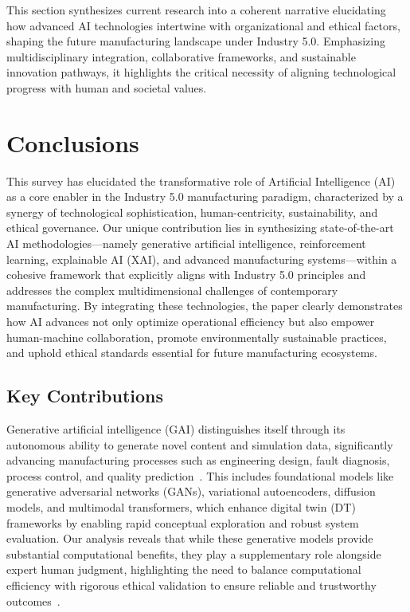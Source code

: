 \documentclass[sigconf]{acmart}
\begin{document}
This section synthesizes current research into a coherent narrative elucidating how advanced AI technologies intertwine with organizational and ethical factors, shaping the future manufacturing landscape under Industry 5.0. Emphasizing multidisciplinary integration, collaborative frameworks, and sustainable innovation pathways, it highlights the critical necessity of aligning technological progress with human and societal values.

\section{Conclusions}

This survey has elucidated the transformative role of Artificial Intelligence (AI) as a core enabler in the Industry 5.0 manufacturing paradigm, characterized by a synergy of technological sophistication, human-centricity, sustainability, and ethical governance. Our unique contribution lies in synthesizing state-of-the-art AI methodologies—namely generative artificial intelligence, reinforcement learning, explainable AI (XAI), and advanced manufacturing systems—within a cohesive framework that explicitly aligns with Industry 5.0 principles and addresses the complex multidimensional challenges of contemporary manufacturing. By integrating these technologies, the paper clearly demonstrates how AI advances not only optimize operational efficiency but also empower human-machine collaboration, promote environmentally sustainable practices, and uphold ethical standards essential for future manufacturing ecosystems.

\subsection{Key Contributions}

Generative artificial intelligence (GAI) distinguishes itself through its autonomous ability to generate novel content and simulation data, significantly advancing manufacturing processes such as engineering design, fault diagnosis, process control, and quality prediction~\cite{ref1,ref5,ref24}. This includes foundational models like generative adversarial networks (GANs), variational autoencoders, diffusion models, and multimodal transformers, which enhance digital twin (DT) frameworks by enabling rapid conceptual exploration and robust system evaluation. Our analysis reveals that while these generative models provide substantial computational benefits, they play a supplementary role alongside expert human judgment, highlighting the need to balance computational efficiency with rigorous ethical validation to ensure reliable and trustworthy outcomes~\cite{ref2,ref6,ref14}.
\end{document}
